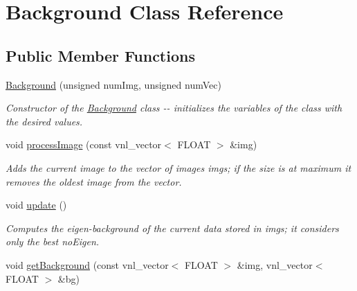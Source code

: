 \hypertarget{classBackground}{
\section{Background Class Reference}
\label{classBackground}
}
\subsection*{Public Member Functions}
\begin{DoxyCompactItemize}
\item 
\hypertarget{classBackground_a35fd9e4820fcc516dcb6f0aafd4b81a5}{
\hyperlink{classBackground_a35fd9e4820fcc516dcb6f0aafd4b81a5}{Background} (unsigned numImg, unsigned numVec)}
\label{classBackground_a35fd9e4820fcc516dcb6f0aafd4b81a5}

\begin{DoxyCompactList}\small\item\em Constructor of the {\ttfamily \hyperlink{classBackground}{Background}} class -\/-\/ initializes the variables of the class with the desired values. \item\end{DoxyCompactList}\item 
\hypertarget{classBackground_a525a161bc5029be7179fe7f73efc03f1}{
void \hyperlink{classBackground_a525a161bc5029be7179fe7f73efc03f1}{processImage} (const vnl\_\-vector$<$ FLOAT $>$ \&img)}
\label{classBackground_a525a161bc5029be7179fe7f73efc03f1}

\begin{DoxyCompactList}\small\item\em Adds the current image to the vector of images {\ttfamily imgs}; if the size is at maximum it removes the oldest image from the vector. \item\end{DoxyCompactList}\item 
\hypertarget{classBackground_ac5c54df7ed3b930268c8d7752c101725}{
void \hyperlink{classBackground_ac5c54df7ed3b930268c8d7752c101725}{update} ()}
\label{classBackground_ac5c54df7ed3b930268c8d7752c101725}

\begin{DoxyCompactList}\small\item\em Computes the eigen-\/background of the current data stored in {\ttfamily imgs}; it considers only the best {\ttfamily noEigen}. \item\end{DoxyCompactList}\item 
\hypertarget{classBackground_affc7eee3386eba2f0bfb53101fb32237}{
void \hyperlink{classBackground_affc7eee3386eba2f0bfb53101fb32237}{getBackground} (const vnl\_\-vector$<$ FLOAT $>$ \&img, vnl\_\-vector$<$ FLOAT $>$ \&bg)}
\label{classBackground_affc7eee3386eba2f0bfb53101fb32237}


\end{DoxyCompactItemize}
